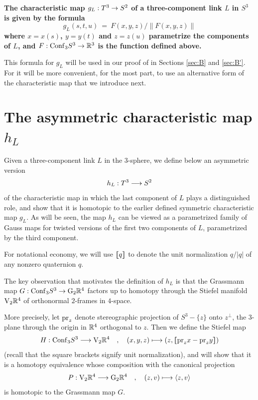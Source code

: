 \begin{proposition}
\label{prop:char}
\textbf{\boldmath The characteristic map $g_L:T^3\to S^2$ of a three-component link $L$ in $S^3$ is given by the formula
$$
g_L(s,t,u) \ = \ F(x,y,z)/\|F(x,y,z)\|
$$
where $x = x(s)$, $y = y(t)$ and $z = z(u)$ parametrize the components of $L$, and $F:\mathrm{Conf}_{3}S^3\to\mathbb R^3$ is the function defined above.}
\end{proposition}

This formula for $g_L$ will be used in our proof of  in Sections \ref{sec:B} and \ref{sec:B'}.  
For  it will be more convenient, for the most part, to use an alternative form of the characteristic map that we introduce next.

\part{The asymmetric characteristic map $h_L$}

Given a three-component link $L$ in the $3$-sphere, we define below an asymmetric version 
$$
h_L:T^3\longrightarrow S^2
$$
of the characteristic map in which the last component of $L$ plays a distinguished role, and show that it is homotopic to the earlier defined symmetric characteristic map $g_L$.  As will be seen, the map $h_L$ can be viewed as a parametrized family of Gauss maps for twisted versions of the first two components of $L$, parametrized by the third component.  

For notational economy, we will use $\lceil\!\!\!\hskip.01in \lfloor q \rceil\!\!\!\hskip.01in\rfloor$ to denote the unit normalization $q/|q|$ of any nonzero quaternion $q$.

The key observation that motivates the definition of $h_L$ is that the Grassmann map $G:\mathrm{Conf}_{3}S^3\to\mathrm{G}_2\mathbb R^4$ factors up to homotopy through the {\itb Stiefel manifold} $\mathrm{V}_2\mathbb R^4$ of orthonormal $2$-frames in $4$-space.  

More precisely, let $\mathrm{pr}_z$ denote {\itb stereographic projection} of $S^3-\{z\}$ onto $z^\perp$, the $3$-plane through the origin in $\mathbb R^4$ orthogonal to $z$.  Then we define the {\itb Stiefel map}
$$
H:\mathrm{Conf}_{3}S^3\longrightarrow\mathrm{V}_2\mathbb R^4 \quad,\quad (x,y,z) \longmapsto (z,\lceil\!\!\!\hskip.01in \lfloor \mathrm{pr}_zx-\mathrm{pr}_zy \rceil\!\!\!\hskip.01in\rfloor)
$$
(recall that the square brackets signify unit normalization), and will show that it is a homotopy equivalence whose composition with the canonical projection 
$$
P:\mathrm{V}_2\mathbb R^4\longrightarrow\mathrm{G}_2\mathbb R^4 \quad,\quad (z,v)\longmapsto\langle z,v\rangle
$$
is homotopic to the Grassmann map $G$.  

